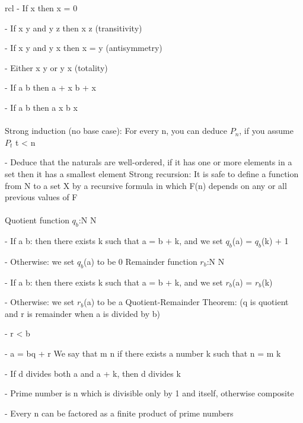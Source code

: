 \documentclass{article}
\begin{document}
\begin{arrary}{rcl}
- If \math x \) then \math x = 0\)

- If \math x \leq y\) and \math y \leq z\) then \math x \leq z\) (transitivity)

- If \math x \leq y\) and \math y \leq x\) then \math x = y\) (antisymmetry)

- Either \math x \leq y\) or \math y \leq x\) (totality)

- If \math a \leq b\) then \math a + x \leq b + x\) 

- If \math a \leq b\) then \math a \times x \leq b \times x\)
\\
\\
Strong induction (no base case): For every n, you can deduce $P_n$, if you assume $P_t$ \forall t < n\)

- Deduce that the naturals are well-ordered, if it has one or more elements in a set then it has a smallest element
\newline Strong recursion: It is safe to define a function from N to a set X by a recursive formula in which F(n) depends on any or all previous values of F
\\
\\
Quotient function \math $q_b$:N \rightarrow N\)

- If \math a \geq b\): then there exists k such that \math a = b + k\), and we set \math $q_b$(a) = $q_b$(k) + 1\)

- Otherwise: we set \math $q_b$(a)\) to be 0
\newline Remainder function \math $r_b$:N \rightarrow N\)

- If \math a \geq b\): then there exists k such that \math a = b + k\), and we set \math $r_b$(a) = $r_b$(k)\)

- Otherwise: we set \math $r_b$(a)\) to be a
\newline Quotient-Remainder Theorem: (q is quotient and r is remainder when a is divided by b)

-  \leq r < b\)

- \math a = bq + r\)
\newline We say that \math m \vert n\) if there exists a number k such that \math n = m \times k\)

- If d divides both a and \math a + k\), then d divides k

- Prime number is \math n \) which is divisible only by 1 and itself, otherwise composite

- Every \math n \) can be factored as a finite product of prime numbers


\end{arrary}
\end{document}
